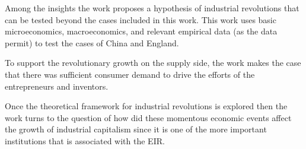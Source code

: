 	Among the insights the work proposes a hypothesis of industrial revolutions that can be tested beyond the cases included in this work. This work uses basic microeconomics, macroeconomics, and relevant empirical data (as the data permit) to test the cases of China and England.

	To support the revolutionary growth on the supply side, the work makes the case that there was sufficient consumer demand to drive the efforts of the entrepreneurs and inventors.
	
	Once the theoretical framework for industrial revolutions is explored then the work turns to the question of how did these momentous economic events affect the growth of industrial capitalism since it is one of the more important institutions that is associated with the EIR.
